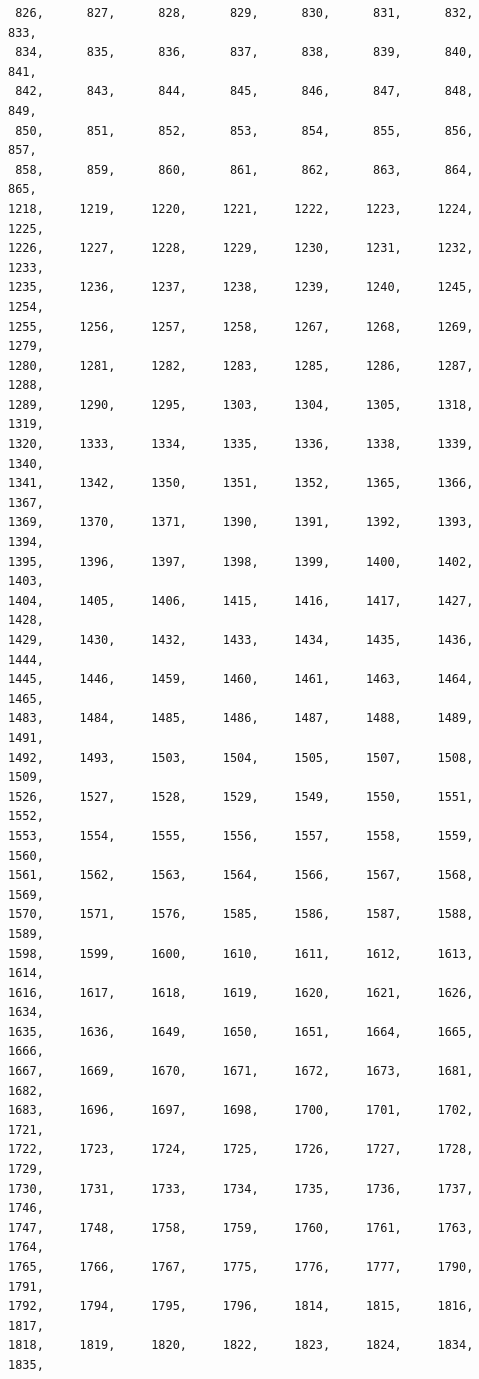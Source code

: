 \documentclass[a4paper,11pt]{report}
\begin{document}
\begin{verbatim}
 826,      827,      828,      829,      830,      831,      832,      833,
 834,      835,      836,      837,      838,      839,      840,      841,
 842,      843,      844,      845,      846,      847,      848,      849,
 850,      851,      852,      853,      854,      855,      856,      857,
 858,      859,      860,      861,      862,      863,      864,      865,
1218,     1219,     1220,     1221,     1222,     1223,     1224,     1225,
1226,     1227,     1228,     1229,     1230,     1231,     1232,     1233,
1235,     1236,     1237,     1238,     1239,     1240,     1245,     1254,
1255,     1256,     1257,     1258,     1267,     1268,     1269,     1279,
1280,     1281,     1282,     1283,     1285,     1286,     1287,     1288,
1289,     1290,     1295,     1303,     1304,     1305,     1318,     1319,
1320,     1333,     1334,     1335,     1336,     1338,     1339,     1340,
1341,     1342,     1350,     1351,     1352,     1365,     1366,     1367,
1369,     1370,     1371,     1390,     1391,     1392,     1393,     1394,
1395,     1396,     1397,     1398,     1399,     1400,     1402,     1403,
1404,     1405,     1406,     1415,     1416,     1417,     1427,     1428,
1429,     1430,     1432,     1433,     1434,     1435,     1436,     1444,
1445,     1446,     1459,     1460,     1461,     1463,     1464,     1465,
1483,     1484,     1485,     1486,     1487,     1488,     1489,     1491,
1492,     1493,     1503,     1504,     1505,     1507,     1508,     1509,
1526,     1527,     1528,     1529,     1549,     1550,     1551,     1552,
1553,     1554,     1555,     1556,     1557,     1558,     1559,     1560,
1561,     1562,     1563,     1564,     1566,     1567,     1568,     1569,
1570,     1571,     1576,     1585,     1586,     1587,     1588,     1589,
1598,     1599,     1600,     1610,     1611,     1612,     1613,     1614,
1616,     1617,     1618,     1619,     1620,     1621,     1626,     1634,
1635,     1636,     1649,     1650,     1651,     1664,     1665,     1666,
1667,     1669,     1670,     1671,     1672,     1673,     1681,     1682,
1683,     1696,     1697,     1698,     1700,     1701,     1702,     1721,
1722,     1723,     1724,     1725,     1726,     1727,     1728,     1729,
1730,     1731,     1733,     1734,     1735,     1736,     1737,     1746,
1747,     1748,     1758,     1759,     1760,     1761,     1763,     1764,
1765,     1766,     1767,     1775,     1776,     1777,     1790,     1791,
1792,     1794,     1795,     1796,     1814,     1815,     1816,     1817,
1818,     1819,     1820,     1822,     1823,     1824,     1834,     1835,

\end{verbatim}
\end{document}
